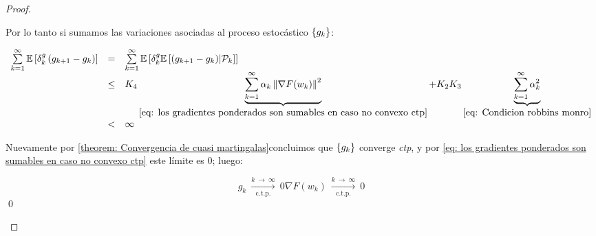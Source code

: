 \begin{proof}
\begin{enumerate}
		 Por lo tanto si sumamos las variaciones asociadas al proceso estoc\'astico $\left\lbrace g_k\right\rbrace$:
		 
		 \begin{equation}
		 \begin{array}{rcl}
		 \sum\limits_{k=1}^{\infty} {\mathbb{E} \left[\delta_k^{g} \left(g_{k+1} - g_k\right)\right]} & = & \sum\limits_{k=1}^{\infty} {\mathbb{E} \left[\delta_k^{g} \mathbb{E} \left[{\left(g_{k+1} - g_k\right)} \vert \mathcal{P}_{k}\right]\right]} \\
		 & \leq & K_4 \underbrace{\sum\limits_{k=1}^{\infty} {\alpha_k \left\lVert\nabla F(w_k)\right\rVert^2}}_{\ref{eq: los gradientes ponderados son sumables en caso no convexo ctp}} + K_2K_3 \underbrace{\sum\limits_{k=1}^{\infty} {\alpha_k^2}}_{\ref{eq: Condicion robbins monro}} \\
		 & < &  \infty
		 \end{array}
		 \end{equation}
		 
		 Nuevamente por \ref{theorem: Convergencia de cuasi martingalas}concluimos que $\left\lbrace g_k\right\rbrace$ converge \textit{ctp}, y por \ref{eq: los gradientes ponderados son sumables en caso no convexo ctp} este l\'imite es $0$; luego:
		 
		 	\begin{subequations}
		 	\begin{equation}
		 	g_k \ \xrightarrow[\text{c.t.p.}]{k \ \rightarrow \ \infty } \ 0
		 	\end{equation}
		 	\begin{equation}
		 	\nabla F(w_k) \ \xrightarrow[\text{c.t.p.}]{k \ \rightarrow \ \infty } \ 0
		 	\end{equation}
		 \end{subequations}
		 \qed
	\end{enumerate}
	
\end{proof}